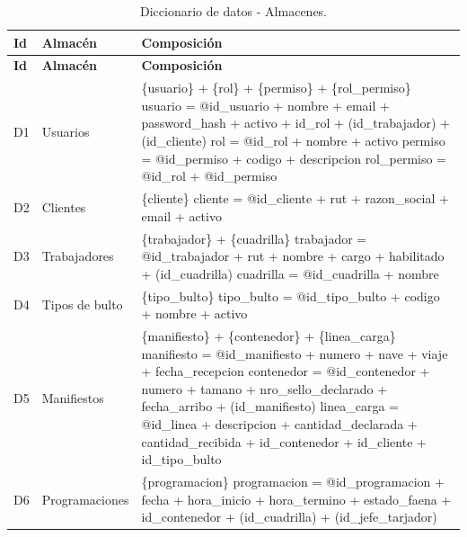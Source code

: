 {\estilotabla
\begin{longtable}{|C{1.0cm}|L{2.4cm}|L{11.2cm}|}
\caption{Diccionario de datos - Almacenes.}
\label{tab:almacenes}\\
\hline
{}
\textbf{Id} & \textbf{Almacén} & \textbf{Composición} \\ \hline
\endfirsthead
\hline
{}
\textbf{Id} & \textbf{Almacén} & \textbf{Composición} \\ \hline
\endhead
D1 & Usuarios & \{usuario\} + \{rol\} + \{permiso\} + \{rol\_permiso\} \newline
usuario = @id\_usuario + nombre + email + password\_hash + activo + id\_rol +
(id\_trabajador) + (id\_cliente) \newline
rol = @id\_rol + nombre + activo \newline
permiso = @id\_permiso + codigo + descripcion \newline
rol\_permiso = @id\_rol + @id\_permiso \\ \hline
D2 & Clientes & \{cliente\} \newline
cliente = @id\_cliente + rut + razon\_social + email + activo \\ \hline
D3 & Trabajadores & \{trabajador\} + \{cuadrilla\} \newline
trabajador = @id\_trabajador + rut + nombre + cargo + habilitado + (id\_cuadrilla) \newline
cuadrilla = @id\_cuadrilla + nombre \\ \hline
D4 & Tipos de bulto & \{tipo\_bulto\} \newline
tipo\_bulto = @id\_tipo\_bulto + codigo + nombre + activo \\ \hline
D5 & Manifiestos & \{manifiesto\} + \{contenedor\} + \{linea\_carga\} \newline
manifiesto = @id\_manifiesto + numero + nave + viaje + fecha\_recepcion \newline
contenedor = @id\_contenedor + numero + tamano + nro\_sello\_declarado + fecha\_arribo +
(id\_manifiesto) \newline
linea\_carga = @id\_linea + descripcion + cantidad\_declarada + cantidad\_recibida +
id\_contenedor + id\_cliente + id\_tipo\_bulto \\ \hline
D6 & Programaciones & \{programacion\} \newline
programacion = @id\_programacion + fecha + hora\_inicio + hora\_termino + estado\_faena +
id\_contenedor + (id\_cuadrilla) + (id\_jefe\_tarjador) \\ \hline

\end{longtable}}

